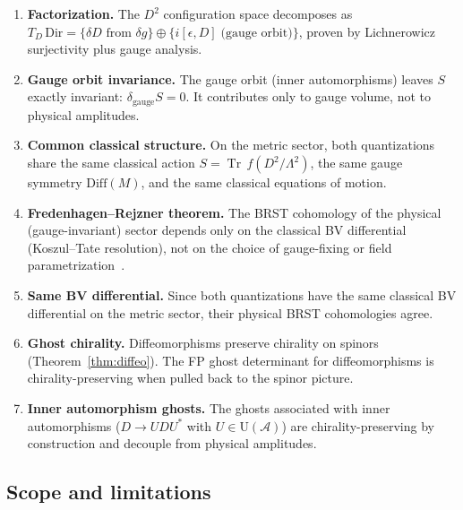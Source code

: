 \documentclass[11pt,a4paper]{article}
\newcommand{\Tr}{\operatorname{Tr}}
\newcommand{\Lam}{\Lambda}
\begin{document}
\begin{enumerate}[label=\textbf{(\Alph*)}]
  \item \textbf{Factorization.}
    The $D^2$ configuration space decomposes as
    $T_D\,\mathrm{Dir} = \{\delta D \text{ from } \delta g\}
    \oplus \{i[\epsilon, D]\;\text{(gauge orbit)}\}$,
    proven by Lichnerowicz surjectivity plus gauge analysis.

  \item \textbf{Gauge orbit invariance.}
    The gauge orbit (inner automorphisms) leaves $S$ exactly invariant:
    $\delta_{\mathrm{gauge}} S = 0$.  It contributes only to gauge
    volume, not to physical amplitudes.

  \item \textbf{Common classical structure.}
    On the metric sector, both quantizations share the same classical
    action $S = \Tr\, f(D^2/\Lam^2)$, the same gauge symmetry
    $\mathrm{Diff}(M)$, and the same classical equations of motion.

  \item \textbf{Fredenhagen--Rejzner theorem.}
    The BRST cohomology of the physical (gauge-invariant) sector
    depends only on the classical BV differential
    (Koszul--Tate resolution), not on the choice of gauge-fixing
    or field parametrization~\cite{FR2013,Rejzner2016}.

  \item \textbf{Same BV differential.}
    Since both quantizations have the same classical BV differential
    on the metric sector, their physical BRST cohomologies agree.

  \item \textbf{Ghost chirality.}
    Diffeomorphisms preserve chirality on spinors
    (Theorem~\ref{thm:diffeo}).  The FP ghost determinant for
    diffeomorphisms is chirality-preserving when pulled back to
    the spinor picture.

  \item \textbf{Inner automorphism ghosts.}
    The ghosts associated with inner automorphisms
    ($D \to UDU^*$ with $U \in \mathrm{U}(\mathcal{A})$) are
    chirality-preserving by construction and decouple from
    physical amplitudes.
\end{enumerate}

\subsection{Scope and limitations}
\end{document}
